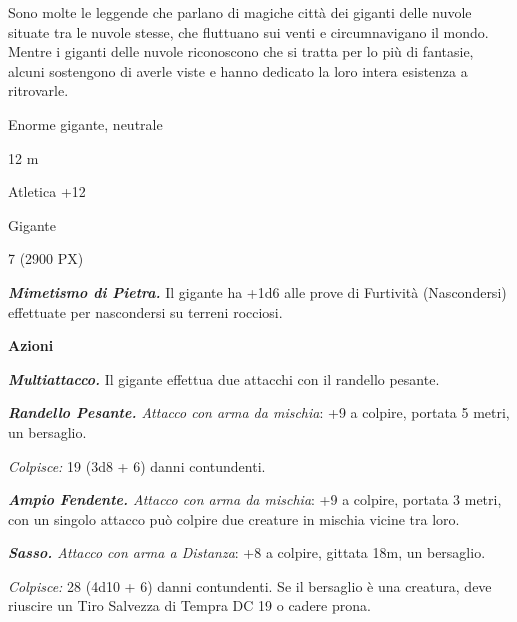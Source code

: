 \begin{multicols}{2}
{Sono molte le leggende che parlano di magiche città dei giganti delle nuvole situate tra le nuvole stesse, che fluttuano sui venti e circumnavigano il mondo. Mentre i giganti delle nuvole riconoscono che si tratta per lo più di fantasie, alcuni sostengono di averle viste e hanno dedicato la loro intera esistenza a ritrovarle.

\begin{description}[noitemsep, topsep=0pt, parsep=0pt, partopsep=0pt, itemsep=1pt, leftmargin=2.35cm,  labelwidth=2.2cm, itemindent=0cm, listparindent=0pt] %
\setlength{\baselineskip}{10pt}
\item[\textbf{Taglia/Tipo}] Enorme gigante, neutrale
\item[\textbf{Caratt.}] 
\item[\textbf{Punti Ferita}] 
\item[\textbf{Movimento}] 12 m
\item[\textbf{Tiri Salvez.}] 
\item[\textbf{Comp.}] Atletica +12
\item[\textbf{Sensi}] 
\item[\textbf{Linguaggi}] Gigante
\item[\textbf{Sfida}] 7 (2900 PX)
\end{description}
\smallskip

\emph{\textbf{Mimetismo di Pietra.}} Il gigante ha +1d6 alle prove di Furtività (Nascondersi) effettuate per nascondersi su terreni rocciosi.

\textbf{Azioni}

\emph{\textbf{Multiattacco.}} Il gigante effettua due attacchi con il randello pesante.

\emph{\textbf{Randello Pesante.} Attacco con arma da mischia}: +9 a colpire, portata 5 metri, un bersaglio.

\emph{Colpisce:} 19 (3d8 + 6) danni contundenti.

\emph{\textbf{Ampio Fendente.} Attacco con arma da mischia}: +9 a colpire, portata 3 metri, con un singolo attacco può colpire due creature in mischia vicine tra loro.

\emph{\textbf{Sasso.} Attacco con arma a Distanza}: +8 a colpire, gittata 18m, un bersaglio.

\emph{Colpisce:} 28 (4d10 + 6) danni contundenti. Se il bersaglio è una creatura, deve riuscire un Tiro Salvezza di Tempra DC 19 o cadere prona.

}
\end{multicols}
